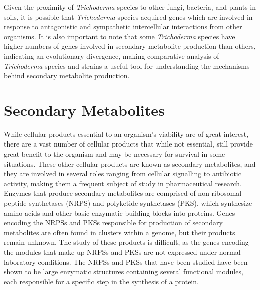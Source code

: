 Given the proximity of \textit{Trichoderma} species to other fungi, bacteria, and plants in soils, it is possible that \textit{Trichoderma} species acquired genes which are involved in response to antagonistic and sympathetic intercellular interactions from other organisms. It is also important to note that some \textit{Trichoderma} species have higher numbers of genes involved in secondary metabolite production than others, indicating an evolutionary divergence, making comparative analysis of \textit{Trichoderma} species and strains a useful tool for understanding the mechanisms behind secondary metabolite production\cite{Mukherjee2012}.

\section{Secondary Metabolites}
\label{lit:secondary-metabolites}

While cellular products essential to an organism's viability are
of great interest, there are a vast number of cellular products that while not
essential, still provide great benefit to the
organism and may be necessary for survival in some situations\cite{Craney2013}\cite{Mukherjee2012}. These other cellular products are known
 as secondary metabolites, and they are involved in several roles ranging 
 from cellular signalling to antibiotic activity, making them a frequent 
 subject of study in pharmaceutical research. Enzymes that produce 
 secondary metabolites are comprised of non-ribosomal peptide synthetases 
 (NRPS) and polyketide synthetases (PKS), which synthesize amino acids and 
 other basic enzymatic building blocks\cite{Komaki2020} into proteins. 
 Genes encoding the NRPSs and PKSs responsible for production of secondary 
 metabolites are often found in clusters within a genome, but their 
 products remain unknown\cite{Mukherjee2012}. 
 The study of these products is difficult, as the genes encoding the modules that make up NRPSs and PKSs are not expressed under normal laboratory conditions\cite{Mukherjee2012}. The NRPSs and PKSs that have been studied
 have been shown to be large enzymatic structures containing several 
 functional modules, each responsible for a specific step in the synthesis 
 of a protein\cite{Mukherjee2012}. 

